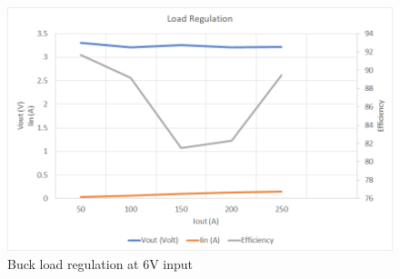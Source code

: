 \\
\begin{figure}[H]
	\centering
	\includegraphics[width=\columnwidth]{IMGS/Buck load regulation at 6V input.png}
	\caption{Buck load regulation at 6V input}
	\label{fig:arch}
\end{figure}



